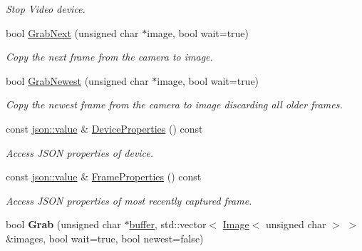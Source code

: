 \begin{DoxyCompactItemize}
\begin{DoxyCompactList}\small\item\em Stop Video device. \end{DoxyCompactList}\item 
bool \hyperlink{structpangolin_1_1_video_record_repeat_a02e8a9acf1860b9cfa163c9423daa227}{Grab\+Next} (unsigned char $\ast$image, bool wait=true)
\begin{DoxyCompactList}\small\item\em Copy the next frame from the camera to image. \end{DoxyCompactList}\item 
bool \hyperlink{structpangolin_1_1_video_record_repeat_a69a05858f73b533a5598add0c9d3dd2f}{Grab\+Newest} (unsigned char $\ast$image, bool wait=true)
\begin{DoxyCompactList}\small\item\em Copy the newest frame from the camera to image discarding all older frames. \end{DoxyCompactList}\item 
const \hyperlink{classpangolin_1_1json_1_1value}{json\+::value} \& \hyperlink{structpangolin_1_1_video_record_repeat_a71b988cb501381fe7c51438fb8a9bdb9}{Device\+Properties} () const \hypertarget{structpangolin_1_1_video_record_repeat_a71b988cb501381fe7c51438fb8a9bdb9}{}\label{structpangolin_1_1_video_record_repeat_a71b988cb501381fe7c51438fb8a9bdb9}

\begin{DoxyCompactList}\small\item\em Access J\+S\+ON properties of device. \end{DoxyCompactList}\item 
const \hyperlink{classpangolin_1_1json_1_1value}{json\+::value} \& \hyperlink{structpangolin_1_1_video_record_repeat_a9946eb41120ac4c7c9715bffc8f59af0}{Frame\+Properties} () const \hypertarget{structpangolin_1_1_video_record_repeat_a9946eb41120ac4c7c9715bffc8f59af0}{}\label{structpangolin_1_1_video_record_repeat_a9946eb41120ac4c7c9715bffc8f59af0}

\begin{DoxyCompactList}\small\item\em Access J\+S\+ON properties of most recently captured frame. \end{DoxyCompactList}\item 
bool {\bfseries Grab} (unsigned char $\ast$\hyperlink{structpangolin_1_1buffer}{buffer}, std\+::vector$<$ \hyperlink{structpangolin_1_1_image}{Image}$<$ unsigned char $>$ $>$ \&images, bool wait=true, bool newest=false)\hypertarget{structpangolin_1_1_video_record_repeat_a97e8822a94103ed15cd4efd62c554953}{}\label{structpangolin_1_1_video_record_repeat_a97e8822a94103ed15cd4efd62c554953}


\end{DoxyCompactItemize}
